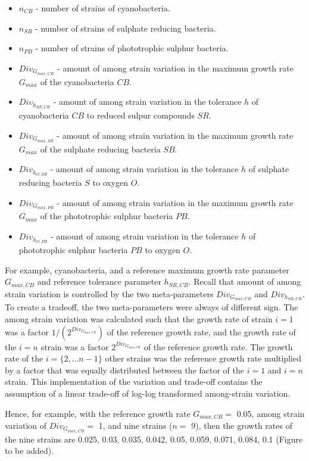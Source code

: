 \documentclass{article}
\begin{document}
\begin{itemize}
\tightlist
\item
  \(n_{CB}\) - number of strains of cyanobacteria.
\item
  \(n_{SB}\) - number of strains of sulphate reducing bacteria.
\item
  \(n_{PB}\) - number of strains of phototrophic sulphur bacteria.
\item
  \(Div_{G_{max,CB}}\) - amount of among strain variation in the maximum
  growth rate \(G_{max}\) of the cyanobacteria \(CB\).
\item
  \(Div_{h_{SR,CB}}\) - amount of among strain variation in the
  tolerance \(h\) of cyanobacteria \(CB\) to reduced sulpur compounds
  \(SR\).
\item
  \(Div_{G_{max,SB}}\) - amount of among strain variation in the maximum
  growth rate \(G_{max}\) of the sulphate reducing bacteria \(SB\).
\item
  \(Div_{h_{O,SB}}\) - amount of among strain variation in the tolerance
  \(h\) of sulphate reducing bacteria \(S\) to oxygen \(O\).
\item
  \(Div_{G_{max,PB}}\) - amount of among strain variation in the maximum
  growth rate \(G_{max}\) of the phototrophic sulphur bacteria \(PB\).
\item
  \(Div_{h_{O,PB}}\) - amount of among strain variation in the tolerance
  \(h\) of phototrophic sulphur bacteria \(PB\) to oxygen \(O\).
\end{itemize}

For example, cyanobacteria, and a reference maximum growth rate
parameter \(G_{max,CB}\) and reference tolerance parameter
\(h_{SR,CB}\). Recall that amount of among strain variation is
controlled by the two meta-parameters \(Div_{G_{max,CB}}\) and
\(Div_{h_{SR,CB}}\). To create a tradeoff, the two meta-parameters were
always of different sign. The among strain variation was calculated such
that the growth rate of strain \(i = 1\) was a factor
\(1/(2^{Div_{G_{max,CB}}})\) of the reference growth rate, and the
growth rate of the \(i = n\) strain was a factor
\(2^{Div_{G_{max,CB}}}\) of the reference growth rate. The growth rate
of the \(i = \{2,...n-1\}\) other strains was the reference growth rate
multiplied by a factor that was equally distributed between the factor
of the \(i = 1\) and \(i = n\) strain. This implementation of the
variation and trade-off contains the assumption of a linear trade-off of
log-log transformed among-strain variation.

Hence, for example, with the reference growth rate \(G_{max,CB} =\)
0.05, among strain variation of \(Div_{G_{max,CB}} =\) 1, and nine
strains (\(n =\) 9), then the growth rates of the nine strains are
0.025, 0.03, 0.035, 0.042, 0.05, 0.059, 0.071, 0.084, 0.1 (Figure to be
added).
\end{document}
